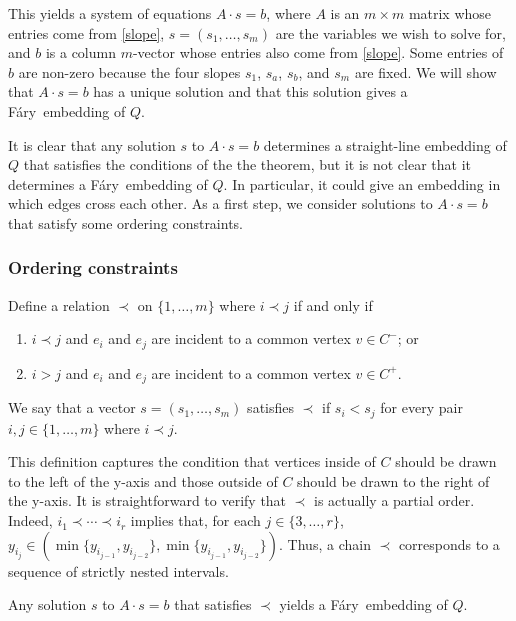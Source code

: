\documentclass{patmorin}
\newcommand{\Fary}{Fáry}
\begin{document}
This yields a system of equations $A\cdot s = b$, where $A$ is an $m\times
m$ matrix whose entries come from \eqref{slope}, $s=(s_1,\ldots,s_m)$
are the variables we wish to solve for, and $b$ is a column $m$-vector
whose entries also come from \eqref{slope}.  Some entries of $b$
are non-zero because the four slopes $s_1$, $s_a$, $s_b$, and $s_m$
are fixed.  We will show that $A\cdot s=b$ has a unique solution and
that this solution gives a \Fary\ embedding of $Q$.

It is clear that any solution $s$ to $A\cdot s=b$ determines a
straight-line embedding of $Q$ that satisfies the conditions of the the
theorem, but it is not clear that it determines a \Fary\ embedding of $Q$.
In particular, it could give an embedding in which edges cross each other.
As a first step, we consider solutions to $A\cdot s=b$ that satisfy some
ordering constraints.

\subsubsection{Ordering constraints}

Define a relation $\prec$ on $\{1,\ldots,m\}$ where $i \prec j$
if and only if
\begin{enumerate}
  \item $i \prec j$ and $e_i$ and $e_j$ are incident to a common vertex
  $v\in C^-$; or
  \item $i > j$ and $e_i$ and $e_j$ are incident to a common vertex $v\in C^+$.
\end{enumerate}
We say that a vector $s=(s_1,\ldots,s_m)$ satisfies $\prec$ if $s_i <
s_j$ for every pair $i,j\in\{1,\ldots,m\}$ where $i\prec j$.  

This definition captures the condition that vertices inside of $C$
should be drawn to the left of the y-axis and those outside of $C$
should be drawn to the right of the y-axis.  It is straightforward
to verify that $\prec$ is actually a partial order. Indeed, $i_1\prec
\cdots \prec i_r$ implies that, for each $j\in\{3,\ldots,r\}$, $y_{i_j}\in
(\min\{y_{i_{j-1}},y_{i_{j-2}}\}, \min\{y_{i_{j-1}},y_{i_{j-2}}\})$. Thus,
a chain $\prec$ corresponds to a sequence of strictly nested intervals.

\begin{lem}
   Any solution $s$ to $A\cdot s=b$ that satisfies $\prec$ yields a
   \Fary\ embedding of $Q$.
\end{lem}
\end{document}
